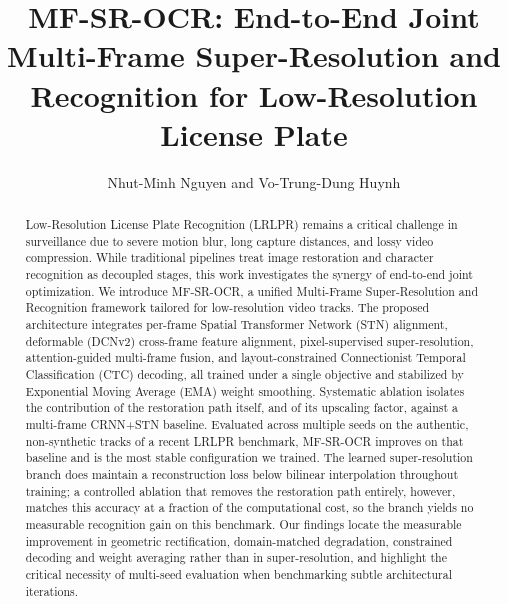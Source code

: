 \documentclass[runningheads]{llncs}
\begin{document}
%
\title{MF-SR-OCR: End-to-End Joint Multi-Frame Super-Resolution and Recognition for Low-Resolution License Plate}
%
%
\author{Nhut-Minh Nguyen and 
Vo-Trung-Dung Huynh 
}
%
%
%
\maketitle              %
%
\begin{abstract}
Low-Resolution License Plate Recognition (LRLPR) remains a critical challenge in surveillance due to severe motion blur, long capture distances, and lossy video compression. While traditional pipelines treat image restoration and character recognition as decoupled stages, this work investigates the synergy of end-to-end joint optimization. We introduce MF-SR-OCR, a unified Multi-Frame Super-Resolution and Recognition framework tailored for low-resolution video tracks. The proposed architecture integrates per-frame Spatial Transformer Network (STN) alignment, deformable (DCNv2) cross-frame feature alignment, pixel-supervised super-resolution, attention-guided multi-frame fusion, and layout-constrained Connectionist Temporal Classification (CTC) decoding, all trained under a single objective and stabilized by Exponential Moving Average (EMA) weight smoothing. Systematic ablation isolates the contribution of the restoration path itself, and of its upscaling factor, against a multi-frame CRNN+STN baseline. Evaluated across multiple seeds on the authentic, non-synthetic tracks of a recent LRLPR benchmark, MF-SR-OCR improves on that baseline and is the most stable configuration we trained. The learned super-resolution branch does maintain a reconstruction loss below bilinear interpolation throughout training; a controlled ablation that removes the restoration path entirely, however, matches this accuracy at a fraction of the computational cost, so the branch yields no measurable recognition gain on this benchmark. Our findings locate the measurable improvement in geometric rectification, domain-matched degradation, constrained decoding and weight averaging rather than in super-resolution, and highlight the critical necessity of multi-seed evaluation when benchmarking subtle architectural iterations.
\end{abstract}
%
%
%
\end{document}
